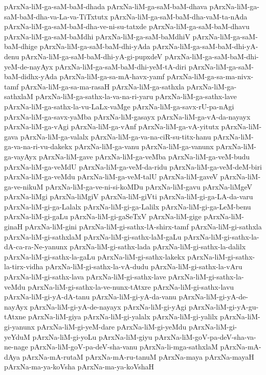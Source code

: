 {pArxNa-liM-ga-saM-baM-dhada
pArxNa-liM-ga-saM-baM-dhava
pArxNa-liM-ga-saM-baM-dha-va-La-va-TiTxtutx
pArxNa-liM-ga-saM-baM-dha-vaM-ta-nAda
pArxNa-liM-ga-saM-baM-dha-ve-ni-su-tatxde
pArxNa-liM-ga-saM-baM-dhavu
pArxNa-liM-ga-saM-baMdhi
pArxNa-liM-ga-saM-baMdhiV
pArxNa-liM-ga-saM-baM-dhige
pArxNa-liM-ga-saM-baM-dhi-yAda
pArxNa-liM-ga-saM-baM-dhi-yA-denu
pArxNa-liM-ga-saM-baM-dhi-yA-gi-pupxdeV
pArxNa-liM-ga-saM-baM-dhi-yeM-de-nayAyx
pArxNa-liM-ga-saM-baM-dhi-yeM-tA-diri
pArxNa-liM-ga-saM-baM-didhx-yAda
pArxNa-liM-ga-sa-mA-havx-yamf
pArxNa-liM-ga-sa-ma-nivx-tamf
pArxNa-liM-ga-sa-ma-rasaH
pArxNa-liM-ga-sathxla
pArxNa-liM-ga-sathxlaM
pArxNa-liM-ga-sathx-la-va-na-ri-yaru
pArxNa-liM-ga-sathx-lave
pArxNa-liM-ga-sathx-la-vu-LaLx-vaMge
pArxNa-liM-ga-savx-rU-pa-nAgi
pArxNa-liM-ga-savx-yaMba
pArxNa-liM-gasayx
pArxNa-liM-ga-vA-da-nayayx
pArxNa-liM-ga-vAgi
pArxNa-liM-ga-vAnf
pArxNa-liM-ga-vA-yitutx
pArxNa-liM-gava
pArxNa-liM-ga-valalx
pArxNa-liM-ga-va-na-ciR-su-titx-hanu
pArxNa-liM-ga-va-na-ri-vu-dakekx
pArxNa-liM-ga-vanu
pArxNa-liM-ga-vanunx
pArxNa-liM-ga-vayAyx
pArxNa-liM-gave
pArxNa-liM-ga-veMba
pArxNa-liM-ga-veM-budu
pArxNa-liM-ga-veMdU
pArxNa-liM-ga-veM-da-ridu
pArxNa-liM-ga-veM-deM-biri
pArxNa-liM-ga-veMdu
pArxNa-liM-ga-veM-talU
pArxNa-liM-gaveV
pArxNa-liM-ga-ve-nikuM
pArxNa-liM-ga-ve-ni-si-koMDu
pArxNa-liM-gavu
pArxNa-liMgeV
pArxNa-liMgi
pArxNa-liMgiV
pArxNa-liM-giVti
pArxNa-liM-gi-ga-LA-da-varu
pArxNa-liM-gi-ga-Lalalx
pArxNa-liM-gi-ga-Lalilx
pArxNa-liM-gi-ga-LeM-benu
pArxNa-liM-gi-gaLu
pArxNa-liM-gi-gaSeTxV
pArxNa-liM-gige
pArxNa-liM-ginaH
pArxNa-liM-gini
pArxNa-liM-gi-sathx-lA-shirx-tamf
pArxNa-liM-gi-sathxla
pArxNa-liM-gi-sathxlaM
pArxNa-liM-gi-sathx-laM-gaLu
pArxNa-liM-gi-sathx-la-dA-ca-ra-Ne-yanunx
pArxNa-liM-gi-sathx-lada
pArxNa-liM-gi-sathx-la-dalilx
pArxNa-liM-gi-sathx-la-gaLu
pArxNa-liM-gi-sathx-lakekx
pArxNa-liM-gi-sathx-la-tirx-vidha
pArxNa-liM-gi-sathx-la-vA-dudu
pArxNa-liM-gi-sathx-la-vAru
pArxNa-liM-gi-sathx-lava
pArxNa-liM-gi-sathx-lave
pArxNa-liM-gi-sathx-la-veMdu
pArxNa-liM-gi-sathx-la-ve-nunx-tAtxre
pArxNa-liM-gi-sathx-lavu
pArxNa-liM-gi-yA-dA-tanu
pArxNa-liM-gi-yA-da-vanu
pArxNa-liM-gi-yA-de-nayAyx
pArxNa-liM-gi-yA-de-nayayx
pArxNa-liM-gi-yAgi
pArxNa-liM-gi-yA-gu-tAtxne
pArxNa-liM-giya
pArxNa-liM-gi-yalalx
pArxNa-liM-gi-yalilx
pArxNa-liM-gi-yanunx
pArxNa-liM-gi-yeM-dare
pArxNa-liM-gi-yeMdu
pArxNa-liM-gi-yeYduM
pArxNa-liM-gi-yoLu
pArxNa-liM-giyu
pArxNa-liM-goV-pa-deV-sha-va-ne-nage
pArxNa-liM-goV-pa-deV-sha-vanu
pArxNa-li-mga-sathxlaM
pArxNa-mA-dAya
pArxNa-mA-rutaM
pArxNa-mA-ru-tanuM
pArxNa-maya
pArxNa-mayaH
pArxNa-ma-ya-koVsha
pArxNa-ma-ya-koVshaH
}
